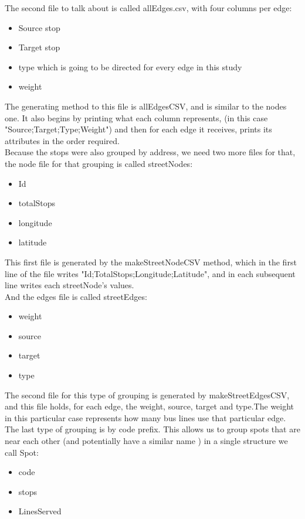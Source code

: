 \documentclass[12pt]{article}
\begin{document}
\begin{multicols}{2}
	The second file to talk about is called allEdges.csv, with four columns per edge:
	
	\begin{itemize}
		\item Source stop
		\item Target stop
		\item type which is going to be directed for every edge in this study
		\item weight 
	\end{itemize}
	
	The generating method to this file is allEdgesCSV, and is similar to the nodes one.
	It also begins by printing what each column represents, (in this case "Source;Target;Type;Weight") and then for each edge it receives, prints its attributes in the order required.\\
    Because the stops were also grouped by address, we need two more files for that, the node file for that grouping is called streetNodes:\\
    \begin{itemize}
    \item Id
    \item totalStops
    \item longitude
    \item latitude
    \end{itemize}
    
    This first file is generated by the makeStreetNodeCSV method, which in the first line of the file writes "Id;TotalStops;Longitude;Latitude", and in each subsequent line writes each streetNode's values. \\
   And the edges file is called streetEdges:\\
   \begin{itemize}
   \item weight
   \item source 
   \item target 
   \item type
   \end{itemize}
    The second file for this type of grouping  is generated by makeStreetEdgesCSV, and this file holds, for each edge, the weight, source, target and type.The weight in this particular case represents how many bus lines use that particular edge.\\
    
	The last type of grouping is by code prefix. This allows us to group spots that are near each other (and potentially have a similar name ) in a single structure we call Spot:
\begin{itemize}
	\item code
	\item stops
	\item LinesServed
\end{itemize}
	

\end{multicols}
\end{document}
